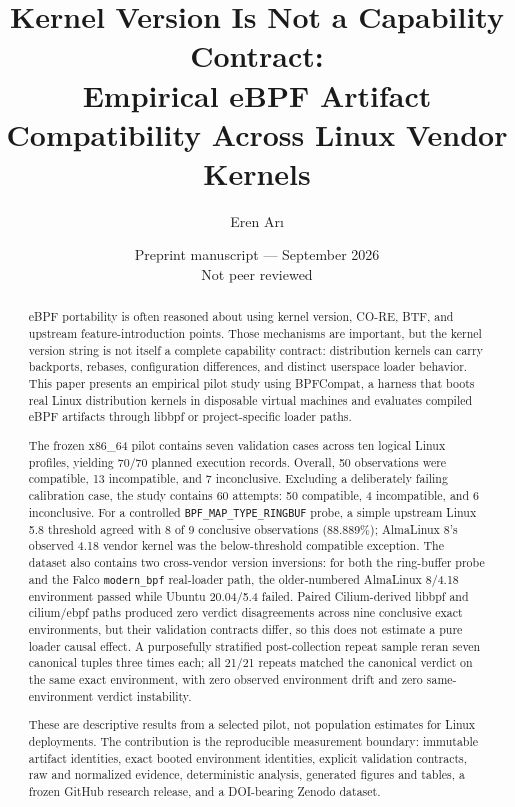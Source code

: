 \documentclass[10pt]{article}
\title{\textbf{Kernel Version Is Not a Capability Contract:}\\Empirical eBPF Artifact Compatibility Across Linux Vendor Kernels}
\author{Eren Ar{\i}}
\date{Preprint manuscript --- September 2026\\\small Not peer reviewed}
\newcommand{\code}[1]{\texttt{#1}}
\begin{document}
\maketitle

\begin{abstract}
eBPF portability is often reasoned about using kernel version, CO-RE, BTF, and upstream feature-introduction points. Those mechanisms are important, but the kernel version string is not itself a complete capability contract: distribution kernels can carry backports, rebases, configuration differences, and distinct userspace loader behavior. This paper presents an empirical pilot study using BPFCompat, a harness that boots real Linux distribution kernels in disposable virtual machines and evaluates compiled eBPF artifacts through libbpf or project-specific loader paths.

The frozen x86\_64 pilot contains seven validation cases across ten logical Linux profiles, yielding 70/70 planned execution records. Overall, 50 observations were compatible, 13 incompatible, and 7 inconclusive. Excluding a deliberately failing calibration case, the study contains 60 attempts: 50 compatible, 4 incompatible, and 6 inconclusive. For a controlled \code{BPF\_MAP\_TYPE\_RINGBUF} probe, a simple upstream Linux 5.8 threshold agreed with 8 of 9 conclusive observations (88.889\%); AlmaLinux 8's observed 4.18 vendor kernel was the below-threshold compatible exception. The dataset also contains two cross-vendor version inversions: for both the ring-buffer probe and the Falco \code{modern\_bpf} real-loader path, the older-numbered AlmaLinux 8/4.18 environment passed while Ubuntu 20.04/5.4 failed. Paired Cilium-derived libbpf and cilium/ebpf paths produced zero verdict disagreements across nine conclusive exact environments, but their validation contracts differ, so this does not estimate a pure loader causal effect. A purposefully stratified post-collection repeat sample reran seven canonical tuples three times each; all 21/21 repeats matched the canonical verdict on the same exact environment, with zero observed environment drift and zero same-environment verdict instability.

These are descriptive results from a selected pilot, not population estimates for Linux deployments. The contribution is the reproducible measurement boundary: immutable artifact identities, exact booted environment identities, explicit validation contracts, raw and normalized evidence, deterministic analysis, generated figures and tables, a frozen GitHub research release, and a DOI-bearing Zenodo dataset.
\end{abstract}
\end{document}
